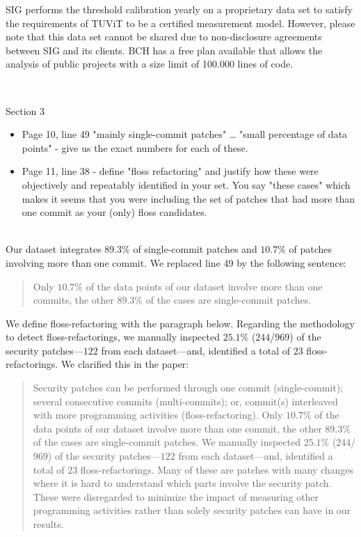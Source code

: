 \documentclass[11pt,fleqn]{article}
\newcommand{\eline}{\vspace*{.75\baselineskip}}
\newcommand{\Referee}[1]{\eline \noindent {\bf Reviewer comment #1:} \\}
\newcommand{\Us}{\eline \noindent {\bf Response:}\\}
\newenvironment{revcomment}[1][]
{\Referee{#1}\begin{rcomment}}
{\end{rcomment}}
\begin{document}
SIG performs the threshold calibration
yearly on a proprietary data set to satisfy the requirements of TUViT to
be a certified measurement model. However, please note that this data set 
cannot be shared due to non-disclosure agreements between SIG and its 
clients. BCH has a free plan available that allows the analysis of public
projects with a size limit of 100.000 lines of code.


\begin{revcomment}[2.13]
    Section 3\\
    \begin{itemize}
        \item Page 10, line 49 "mainly single-commit patches" … "small percentage 
        of data points" - give us the exact numbers for each of these.  
        \item Page 11, line 38 - define "floss refactoring" and justify how these were objectively 
        and repeatably identified in your set. You say "these cases" which makes 
        it seems that you were including the set of patches that had more than one 
        commit as your (only) floss candidates.  
    \end{itemize}
\end{revcomment}

\Us Our dataset integrates $89.3\%$ of single-commit patches and 
$10.7\%$ of patches involving more than one commit. We replaced 
line 49 by the following sentence:

\begin{quote}
    Only $10.7\%$ of the data points 
of our dataset involve more than one commits, the other
$89.3\%$ of the cases are single-commit patches.
\end{quote}

We define floss-refactoring with the paragraph below. 
Regarding the methodology to detect floss-refactorings, 
we manually inspected $25.1\%$ ($244$/$969$) of the security 
patches---$122$ from each dataset---and, 
identified a total of $23$ floss-refactorings. We clarified 
this in the paper:

\begin{quote}
    Security patches can be performed through one commit (single-commit); 
    several consecutive commits (multi-commits); or, commit(s) interleaved with more 
    programming activities (floss-refactoring). Only $10.7\%$ of the data points 
    of our dataset involve more than one commit, the other
    $89.3\%$ of the cases are single-commit patches. We manually 
    inspected $25.1\%$ ($244$/$969$) of the security patches---$122$ from each dataset---and, 
    identified a total of $23$ floss-refactorings. Many of these 
    are patches with many changes where it is hard to understand which parts 
    involve the security patch. These were disregarded to minimize the impact 
    of measuring other programming activities rather than solely security patches
    can have in our results. 
\end{quote}
\end{document}
